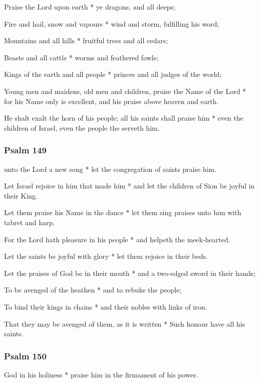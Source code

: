 Praise the Lord upon earth * ye dragons, and all deeps;

Fire and hail, snow and vapours * wind and storm, fulfilling his word;

Mountains and all hills * fruitful trees and all cedars;

Beasts and all cattle * worms and feathered fowls;

Kings of the earth and all people * princes and all judges of the world;

Young men and maidens, old men and children, praise the Name of the Lord * for his Name only is excellent, and his praise above heaven and earth.

He shalt exalt the horn of his people; all his saints shall praise him * even the children of Israel, even the people the serveth him.

\subsubsection{Psalm 149}


 unto the Lord a new song * let the congregation of saints praise him.

Let Israel rejoice in him that made him * and let the children of Sion be joyful in their King.

Let them praise his Name in the dance * let them sing praises unto him with tabret and harp.

For the Lord hath pleasure in his people * and helpeth the meek-hearted.

Let the saints be joyful with glory * let them rejoice in their beds.

Let the praises of God be in their mouth * and a two-edged sword in their hands;

To be avenged of the heathen * and to rebuke the people;

To bind their kings in chains * and their nobles with links of iron.

That they may be avenged of them, as it is written * Such honour have all his saints.

\subsubsection{Psalm 150}


 God in his holiness * praise him in the firmament of his power.


